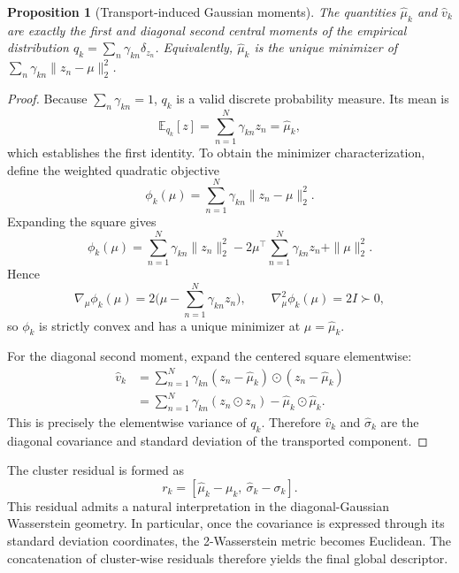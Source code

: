 \documentclass[journal]{IEEEtran}
\newtheorem{proposition}{Proposition}
\begin{document}
\begin{proposition}[Transport-induced Gaussian moments]
The quantities \(\hat{\mu}_k\) and \(\hat{v}_k\) are exactly the first and diagonal second central moments of the empirical distribution \(q_k = \sum_n \gamma_{kn}\delta_{z_n}\). Equivalently, \(\hat{\mu}_k\) is the unique minimizer of \(\sum_n \gamma_{kn}\|z_n-\mu\|_2^2\).
\end{proposition}
\begin{proof}
Because \(\sum_n \gamma_{kn}=1\), \(q_k\) is a valid discrete probability measure. Its mean is
\[
\mathbb{E}_{q_k}[z] = \sum_{n=1}^N \gamma_{kn} z_n = \hat{\mu}_k,
\]
which establishes the first identity. To obtain the minimizer characterization, define the weighted quadratic objective
\[
\phi_k(\mu) = \sum_{n=1}^N \gamma_{kn}\|z_n-\mu\|_2^2.
\]
Expanding the square gives
\[
\phi_k(\mu)
= \sum_{n=1}^N \gamma_{kn}\|z_n\|_2^2 - 2\mu^\top\sum_{n=1}^N \gamma_{kn}z_n + \|\mu\|_2^2.
\]
Hence
\[
\nabla_\mu \phi_k(\mu) = 2\Big(\mu - \sum_{n=1}^N \gamma_{kn}z_n\Big),
\qquad
\nabla_\mu^2 \phi_k(\mu) = 2I \succ 0,
\]
so \(\phi_k\) is strictly convex and has a unique minimizer at \(\mu = \hat{\mu}_k\).

For the diagonal second moment, expand the centered square elementwise:
\begin{align}
\hat{v}_k
&= \sum_{n=1}^N \gamma_{kn}(z_n-\hat{\mu}_k)\odot(z_n-\hat{\mu}_k) \nonumber\\
&= \sum_{n=1}^N \gamma_{kn}(z_n\odot z_n) - \hat{\mu}_k\odot\hat{\mu}_k.
\end{align}
This is precisely the elementwise variance of \(q_k\). Therefore \(\hat{v}_k\) and \(\hat{\sigma}_k\) are the diagonal covariance and standard deviation of the transported component.

\end{proof}

The cluster residual is formed as
\[
r_k = [\hat{\mu}_k - \mu_k,\ \hat{\sigma}_k - \sigma_k].
\]
This residual admits a natural interpretation in the diagonal-Gaussian Wasserstein geometry. In particular, once the covariance is expressed through its standard deviation coordinates, the 2-Wasserstein metric becomes Euclidean. The concatenation of cluster-wise residuals therefore yields the final global descriptor.
\end{document}
